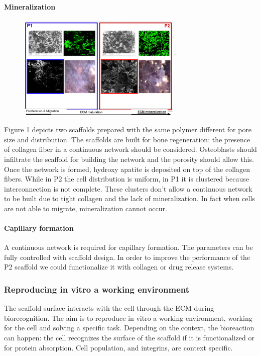 			\paragraph{Mineralization}

			\begin{figure}[h]
				\centering
				\includegraphics[width=0.7\textwidth]{mineralization}
				\caption{\label{fig:min}}
			\end{figure}

			Figure \ref{fig:min} depicts two scaffolds prepared with the same polymer different for pore size and distribution.
			The scaffolds are built for bone regeneration: the presence of collagen fiber in a continuous network should be considered.
			Osteoblasts should infiltrate the scaffold for building the network and the porosity should allow this.
			Once the network is formed, hydroxy apatite is deposited on top of the collagen fibers.
			While in P2 the cell distribution is uniform, in P1 it is clustered because interconnection is not complete.
			These clusters don't allow a continuous network to be built due to tight collagen and the lack of mineralization.
			In fact when cells are not able to migrate, mineralization cannot occur.

			\paragraph{Capillary formation}
			A continuous network is required for capillary formation.
			The parameters can be fully controlled with scaffold design.
			In order to improve the performance of the P2 scaffold we could functionalize it with collagen or drug release systems.

		\subsubsection{Reproducing in vitro a working environment}
		The scaffold surface interacts with the cell through the ECM during biorecognition.
		The aim is to reproduce in vitro a working environment, working for the cell and solving a specific task.
		Depending on the context, the bioreaction can happen: the cell recognizes the surface of the scaffold if it is functionalized or for protein absorption.
		Cell population, and integrins, are context specific.

